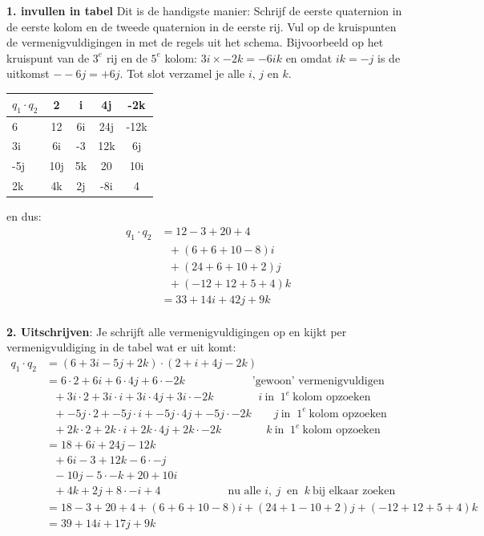 \textbf{1. invullen in tabel} Dit is de handigste manier:  Schrijf de eerste quaternion in de eerste kolom en de tweede quaternion in de eerste rij. Vul op de kruispunten de 
vermenigvuldigingen in met de  regels uit het schema. Bijvoorbeeld op het kruispunt van de $ 3^e $ rij en de $   5^e $ kolom: $  3i\times -2k = -6ik   $ en omdat $ ik = -j $ is de uitkomst $ --6j = +6j $. Tot slot verzamel je  alle $i$, $j$ en $k$.
\begin{center}
	\begin{tabular}{ | l || c | c |c |c |}
		\hline
		$ q_1\cdot q_2 $& 2 & i & 4j & -2k \\ \hline \hline
		6 & 12 & 6i & 24j & -12k  \\ \hline
		3i & 6i & -3 & 12k & 6j\\ \hline
		-5j & 10j &  5k & 20 & 10i\\ \hline
		2k & 4k & 2j & -8i & 4\\ 
		\hline 
	\end{tabular}
\end{center}
en dus:
\begin{align*}
    q_1\cdot q_2 & = 12 - 3 + 20 + 4 \\
                 & \ \ \ +(6 + 6 + 10 - 8)i \\
                 & \ \ \ +(24 + 6 +10 +2)j \\
                 & \ \ \ +(-12 + 12 + 5 +4 )k \\
                 & = 33 +14i +42j +9k \\
\end{align*}

\textbf{2. Uitschrijven}: Je schrijft alle vermenigvuldigingen op en kijkt per vermenigvuldiging in de tabel wat er uit komt:
\begin{align*}
    q_1\cdot q_2 & = (6 + 3i - 5j + 2k) \cdot  (2 + i + 4j - 2k) \\
                 & =   6\cdot 2 + 6i + 6\cdot 4j + 6\cdot -2k \qquad  \qquad \qquad  \text{'gewoon'  vermenigvuldigen}\\
                 & \ \ \ + 3i\cdot 2 + 3i\cdot i + 3i\cdot 4j + 3i\cdot -2k \qquad \qquad  i\  \text{in } \ 1^e \  \text{kolom opzoeken}\\
                 & \ \ \ + -5j\cdot 2 + -5j\cdot i + -5j\cdot 4j + -5j\cdot -2k \qquad j \  \text{in }\ 1^e \ \text{kolom opzoeken}\\
                 & \ \ \ + 2k\cdot 2 + 2k\cdot i + 2k\cdot 4j + 2k\cdot -2k \qquad \qquad k \  \text{in }\ 1^e \ \text{kolom opzoeken}\\
                 & = 18 + 6i + 24j - 12k \\
                 & \ \ \ + 6i - 3 + 12k -6\cdot -j \\
                 & \ \ \ -10j - 5\cdot -k + 20 +10i \\
                 & \ \ \  + 4k + 2j + 8\cdot -i + 4 \qquad \qquad \qquad   \text{nu alle } i, \ j \ \text{ en } \ k\ \text{bij elkaar  zoeken}\\
                 & = 18 - 3 + 20 + 4 + (6+6 + 10 -8)i + (24 + 1 - 10 + 2)j + (-12 + 12 + 5 + 4)k \\
                 &  = 39 + 14i +17j +9k
\end{align*}

